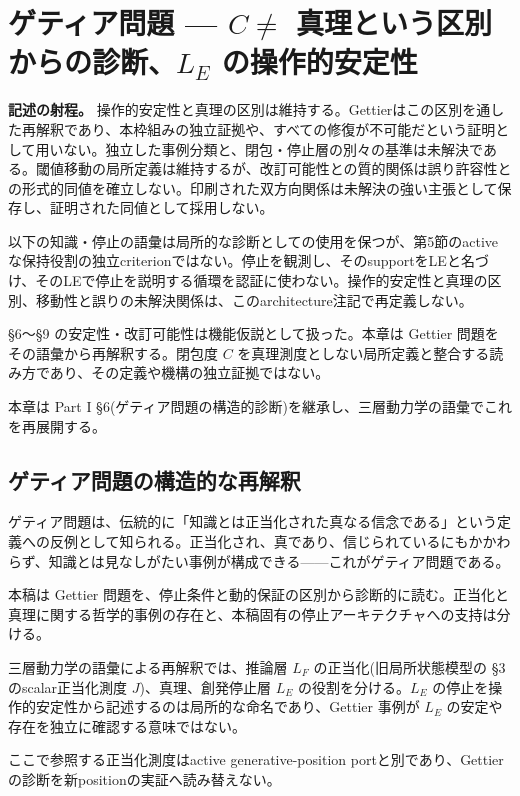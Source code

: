 \section{ゲティア問題 — $C \neq$ 真理という区別からの診断、$L_E$ の操作的安定性}

\noindent\textbf{記述の射程。} 操作的安定性と真理の区別は維持する。Gettierはこの区別を通した再解釈であり、本枠組みの独立証拠や、すべての修復が不可能だという証明として用いない。独立した事例分類と、閉包・停止層の別々の基準は未解決である。閾値移動の局所定義は維持するが、改訂可能性との質的関係は誤り許容性との形式的同値を確立しない。印刷された双方向関係は未解決の強い主張として保存し、証明された同値として採用しない。

以下の知識・停止の語彙は局所的な診断としての使用を保つが、第5節のactiveな保持役割の独立criterionではない。停止を観測し、そのsupportをLEと名づけ、そのLEで停止を説明する循環を認証に使わない。操作的安定性と真理の区別、移動性と誤りの未解決関係は、このarchitecture注記で再定義しない。



\S{}6〜\S{}9 の安定性・改訂可能性は機能仮説として扱った。本章は Gettier 問題をその語彙から再解釈する。閉包度 $C$ を真理測度としない局所定義と整合する読み方であり、その定義や機構の独立証拠ではない。

本章は Part I \S{}6(ゲティア問題の構造的診断)を継承し、三層動力学の語彙でこれを再展開する。

\bigskip


\subsection{ゲティア問題の構造的な再解釈}


ゲティア問題は、伝統的に「知識とは正当化された真なる信念である」という定義への反例として知られる。正当化され、真であり、信じられているにもかかわらず、知識とは見なしがたい事例が構成できる——これがゲティア問題である。

本稿は Gettier 問題を、停止条件と動的保証の区別から診断的に読む。正当化と真理に関する哲学的事例の存在と、本稿固有の停止アーキテクチャへの支持は分ける。

三層動力学の語彙による再解釈では、推論層 $L_F$ の正当化(旧局所状態模型の \S{}3 のscalar正当化測度 $J$)、真理、創発停止層 $L_E$ の役割を分ける。$L_E$ の停止を操作的安定性から記述するのは局所的な命名であり、Gettier 事例が $L_E$ の安定や存在を独立に確認する意味ではない。

ここで参照する正当化測度はactive generative-position portと別であり、Gettierの診断を新positionの実証へ読み替えない。

